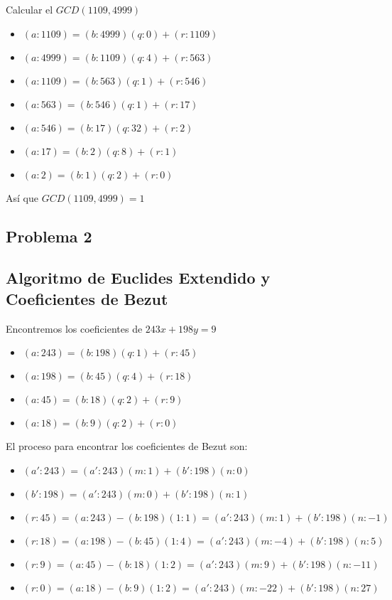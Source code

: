 \documentclass[12pt, fleqn]{article}                             %
\begin{document}
            Calcular el $GCD(1109, 4999)$
            \begin{itemize}
                \item $(a:1109) = (b:4999)(q:0) + (r:1109)$
                \item $(a:4999) = (b:1109)(q:4) + (r:563)$
                \item $(a:1109) = (b:563)(q:1) + (r:546)$
                \item $(a:563) = (b:546)(q:1) + (r:17)$
                \item $(a:546) = (b:17)(q:32) + (r:2)$
                \item $(a:17) = (b:2)(q:8) + (r:1)$
                \item $(a:2) = (b:1)(q:2) + (r:0)$
            \end{itemize}                    
            Así que $GCD(1109, 4999) = 1$\\

    \clearpage
    \subsection{Problema 2}
    \subsection*{Algoritmo de Euclides Extendido y Coeficientes de Bezut}

            Encontremos los coeficientes de $243x + 198y = 9$
            \begin{itemize}
                \item $(a:243) = (b:198)(q:1) + (r:45)$
                \item $(a:198) = (b:45)(q:4) + (r:18)$
                \item $(a:45) = (b:18)(q:2) + (r:9)$
                \item $(a:18) = (b:9)(q:2) + (r:0)$ 
            \end{itemize}

            El proceso para encontrar los coeficientes de Bezut son:

            \begin{itemize}
                \item $(a':243) = (a':243)(m:1) + (b':198)(n:0)$
                \item $(b':198) = (a':243)(m:0) + (b':198)(n:1)$
            \end{itemize}

            \begin{itemize}
                \item $(r:45) = (a:243) - (b:198)(1:1)  =  (a':243)(m:1) + (b':198)(n:-1)$
                \item $(r:18) = (a:198) - (b:45)(1:4)  =  (a':243)(m:-4) + (b':198)(n:5)$
                \item $(r:9) = (a:45) - (b:18)(1:2)  =  (a':243)(m:9) + (b':198)(n:-11)$
                \item $(r:0) = (a:18) - (b:9)(1:2)  =  (a':243)(m:-22) + (b':198)(n:27)$
            \end{itemize}
\end{document}
